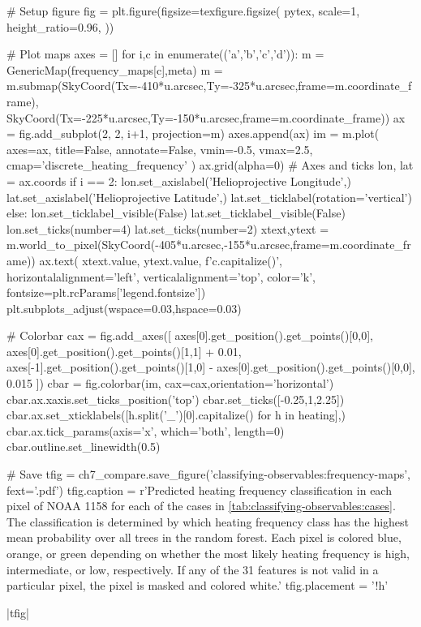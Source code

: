 \begin{pycode}
# Setup figure
fig = plt.figure(figsize=texfigure.figsize(
    pytex,
    scale=1,
    height_ratio=0.96,
))

# Plot maps
axes = []
for i,c in enumerate(('a','b','c','d')):
    m = GenericMap(frequency_maps[c],meta)
    m = m.submap(SkyCoord(Tx=-410*u.arcsec,Ty=-325*u.arcsec,frame=m.coordinate_frame),
                 SkyCoord(Tx=-225*u.arcsec,Ty=-150*u.arcsec,frame=m.coordinate_frame))
    ax = fig.add_subplot(2, 2, i+1, projection=m)
    axes.append(ax)
    im = m.plot(
        axes=ax,
        title=False,
        annotate=False,
        vmin=-0.5,
        vmax=2.5,
        cmap='discrete_heating_frequency'
    )
    ax.grid(alpha=0)
    # Axes and ticks
    lon, lat = ax.coords
    if i == 2:
        lon.set_axislabel('Helioprojective Longitude',)
        lat.set_axislabel('Helioprojective Latitude',)
        lat.set_ticklabel(rotation='vertical')
    else:
        lon.set_ticklabel_visible(False)
        lat.set_ticklabel_visible(False)
    lon.set_ticks(number=4)
    lat.set_ticks(number=2)
    xtext,ytext = m.world_to_pixel(SkyCoord(-405*u.arcsec,-155*u.arcsec,frame=m.coordinate_frame))
    ax.text(
        xtext.value, ytext.value,
        f'{c.capitalize()}',
        horizontalalignment='left',
        verticalalignment='top',
        color='k', fontsize=plt.rcParams['legend.fontsize'])
plt.subplots_adjust(wspace=0.03,hspace=0.03)

# Colorbar
cax = fig.add_axes([
    axes[0].get_position().get_points()[0,0],
    axes[0].get_position().get_points()[1,1] + 0.01,
    axes[-1].get_position().get_points()[1,0] - axes[0].get_position().get_points()[0,0],
    0.015
])
cbar = fig.colorbar(im, cax=cax,orientation='horizontal')
cbar.ax.xaxis.set_ticks_position('top')
cbar.set_ticks([-0.25,1,2.25])
cbar.ax.set_xticklabels([h.split('_')[0].capitalize() for h in heating],)
cbar.ax.tick_params(axis='x', which='both', length=0)
cbar.outline.set_linewidth(0.5)

# Save
tfig = ch7_compare.save_figure('classifying-observables:frequency-maps', fext='.pdf')
tfig.caption = r'Predicted heating frequency classification in each pixel of NOAA 1158 for each of the cases in \autoref{tab:classifying-observables:cases}. The classification is determined by which heating frequency class has the highest mean probability over all trees in the random forest. Each pixel is colored blue, orange, or green depending on whether the most likely heating frequency is high, intermediate, or low, respectively. If any of the 31 features is not valid in a particular pixel, the pixel is masked and colored white.'
tfig.placement = '!h'
\end{pycode}
|tfig|


